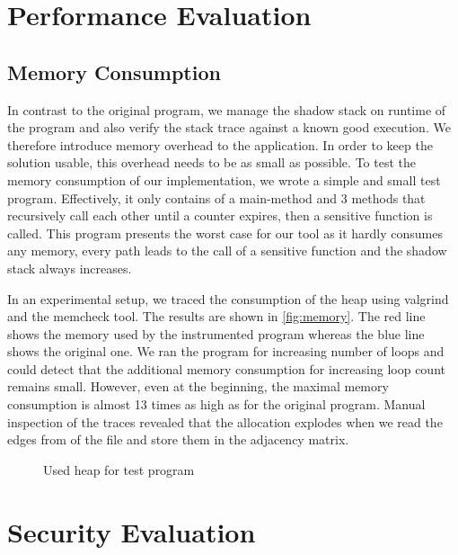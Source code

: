 \documentclass{llncs}
\begin{document}
\section{Performance Evaluation}

\subsection{Memory Consumption}
In contrast to the original program, we manage the shadow stack on runtime of the program and also verify the stack trace against a known good execution. We therefore introduce memory overhead to the application. In order to keep the solution usable, this overhead needs to be as small as possible. To test the memory consumption of our implementation, we wrote a simple and small test program. Effectively, it only contains of a main-method and 3 methods that recursively call each other until a counter expires, then a sensitive function is called. This program presents the worst case for our tool as it hardly consumes any memory, every path leads to the call of a sensitive function and the shadow stack always increases.

In an experimental setup, we traced the consumption of the heap using valgrind and the memcheck tool. The results are shown in \autoref{fig:memory}. The red line shows the memory used by the instrumented program whereas the blue line shows the original one. We ran the program for increasing number of loops and could detect that the additional memory consumption for increasing loop count remains small. However, even at the beginning, the maximal memory consumption is almost 13 times as high as for the original program. Manual inspection of the traces revealed that the allocation explodes when we read the edges from of the file and store them in the adjacency matrix.
\datatable

\begin{figure}
  \centering
  \vspace{-0.4cm}
  \caption{Used heap for test program}
  \label{fig:memory}
  \vspace{-0.4cm}
\end{figure}


\section{Security Evaluation}
\end{document}
